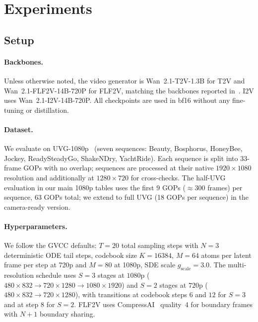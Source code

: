 \section{Experiments}
\label{sec:experiments}

\subsection{Setup}
\label{sec:exp-setup}

\paragraph{Backbones.}
Unless otherwise noted, the video generator is Wan~2.1-T2V-1.3B for T2V
and Wan~2.1-FLF2V-14B-720P for FLF2V, matching the
backbones reported in~\cite{zeng2026gvcc}. I2V uses
Wan~2.1-I2V-14B-720P. All checkpoints are used in bf16 without any
fine-tuning or distillation.

\paragraph{Dataset.}
We evaluate on UVG-1080p~\cite{mercat2020uvg} (seven sequences:
Beauty, Bosphorus, HoneyBee, Jockey, ReadySteadyGo, ShakeNDry,
YachtRide). Each sequence is split into $33$-frame GOPs with no
overlap; sequences are processed at their native $1920 \times 1080$
resolution and additionally at $1280 \times 720$ for cross-checks. The
half-UVG evaluation in our main 1080p tables uses the first $9$ GOPs
($\approx 300$ frames) per sequence, $63$ GOPs total; we extend to full
UVG (18 GOPs per sequence) in the camera-ready version.

\paragraph{Hyperparameters.}
We follow the GVCC defaults: $T\!=\!20$ total sampling steps with
$N\!=\!3$ deterministic ODE tail steps, codebook size $K\!=\!16384$,
$M\!=\!64$ atoms per latent frame per step at 720p and $M\!=\!80$ at
1080p, SDE scale $g_\text{scale}\!=\!3.0$. The multi-resolution
schedule uses $S\!=\!3$ stages at $1080$p
($480 \times 832 \to 720 \times 1280 \to 1080 \times 1920$) and $S\!=\!2$
stages at $720$p ($480 \times 832 \to 720 \times 1280$), with transitions
at codebook steps $6$ and $12$ for $S\!=\!3$ and at step $8$ for $S\!=\!2$.
FLF2V uses CompressAI~\cite{begaint2020compressai} quality~4 for
boundary frames with $N\!+\!1$ boundary sharing.

